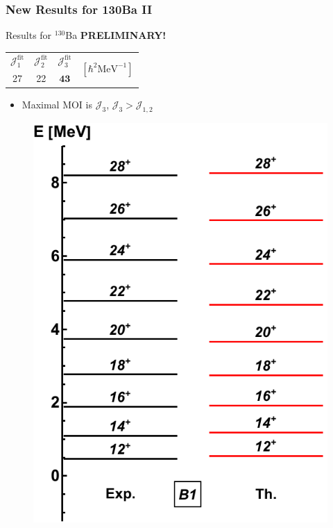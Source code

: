 \documentclass{beamer}
\begin{document}
\begin{frame}
  \frametitle{New Results for 130Ba II}
  \begin{exampleblock}{Results for $^{130}$Ba \textbf{PRELIMINARY!}}
    \begin{table}
      \centering
      \begin{tabular}{|c|c|c|c|}
      \hline
      $\mathcal{J}_1^\text{fit}$ & $\mathcal{J}_2^\text{fit}$ & $\mathcal{J}_3^\text{fit}$ & \multirow{2}{*}{$\left[\hbar^2\text{MeV}^{-1}\right]$} \\ \cline{1-3}
      27                         & 22                         & $\mathbf{43}$                         &                                                       \\ \hline
      \end{tabular}
      \end{table}
      \begin{itemize}
        \item Maximal MOI is $\mathcal{J}_3$, $\mathcal{J}_{3}>\mathcal{J}_{1,2}$
      \end{itemize}
\end{exampleblock}
\begin{figure}
  \centering
  \includegraphics[scale=0.39]{Figs/ba130-band1.pdf}

\end{figure}
\end{frame}
\end{document}
